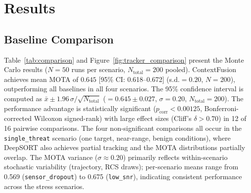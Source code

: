 \documentclass[drones,article,submit,pdftex]{Definitions/mdpi}
\begin{document}
\section{Results}
\label{sec:results}

\subsection{Baseline Comparison}

Table~\ref{tab:comparison} and Figure~\ref{fig:tracker_comparison} present the
Monte Carlo results ($N = 50$ runs per scenario, $N_\text{total}=200$ pooled).
ContextFusion achieves mean MOTA of
$0.645$ [95\% CI: 0.618--0.672] (s.d.$= 0.20$, $N=200$),
outperforming all baselines in all four scenarios.
The 95\% confidence interval is computed as
$\bar{x} \pm 1.96\,\sigma/\!\sqrt{N_\text{total}}$
($= 0.645 \pm 0.027$, $\sigma = 0.20$, $N_\text{total}=200$).
The performance advantage is statistically significant
($p_\text{corr} < 0.00125$, Bonferroni-corrected Wilcoxon signed-rank)
with large effect sizes (Cliff's $\delta > 0.70$) in 12 of 16 pairwise comparisons.
The four non-significant comparisons all occur in the \texttt{single\_threat} scenario
(one target, near-range, benign conditions), where DeepSORT also achieves
partial tracking and the MOTA distributions partially overlap.
The MOTA variance ($\sigma \approx 0.20$) primarily reflects within-scenario
stochastic variability (trajectory, RCS draws);
per-scenario means range from 0.569 (\texttt{sensor\_dropout}) to 0.675
(\texttt{low\_snr}), indicating consistent performance across the stress scenarios.
\end{document}
